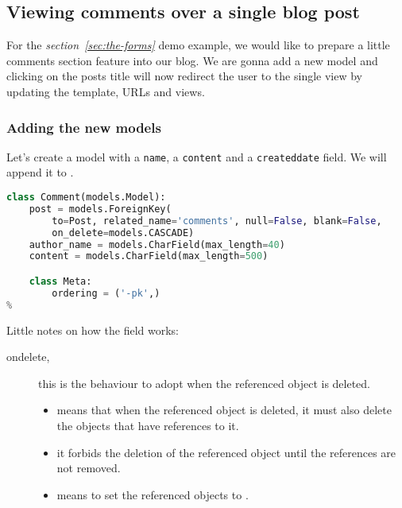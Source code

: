 \subsection{Viewing comments over a single blog post}
    For the \emph{section~\ref{sec:the-forms}} demo example, 
    we would like to prepare a little comments section feature into our blog.
    We are gonna add a new  model and clicking on the posts title
    will now redirect the user to the single view by updating the template, URLs and views.

    \subsubsection{Adding the new models}
        Let's create a  model with a \texttt{name}, 
        a \texttt{content} and a \texttt{created\textunderscore date} field. 
        We will append it to .
        
        \begin{lstlisting}[language=python, title=blog/models.py]
class Comment(models.Model):
    post = models.ForeignKey(
        to=Post, related_name='comments', null=False, blank=False,
        on_delete=models.CASCADE)
    author_name = models.CharField(max_length=40)
    content = models.CharField(max_length=500)

    class Meta:
        ordering = ('-pk',)
%
        \end{lstlisting}
        
        Little notes on how the  field works:
        \begin{description}
            \item[on\textunderscore delete,] this is the behaviour to adopt when the referenced 
                object is deleted.
                \begin{itemize}
                    \item {} means that when the referenced object is deleted, 
                        it must also delete the objects that have references to it.
                    \item {} it forbids the deletion of the referenced 
                        object until the references are not removed.
                    \item {} means to set the referenced 
                        objects to .
                \end{itemize}
        \end{description}
    
